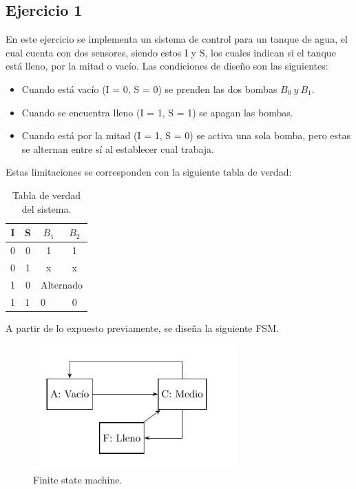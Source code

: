 



\subsection{Ejercicio 1}

En este ejercicio se implementa un sistema de control para un tanque de agua, el cual cuenta con dos sensores, siendo estos I y S, los cuales indican si el tanque está lleno, por la mitad o vacío. Las condiciones de diseño son las siguientes:
\begin{itemize}
\item Cuando está vacío (I = 0, S = 0) se prenden las dos bombas $B_0 \ y \ B_1$.
\item Cuando se encuentra lleno (I = 1, S = 1) se apagan las bombas.
\item Cuando está por la mitad (I = 1, S = 0) se activa una sola bomba, pero estas se alternan entre sí al establecer cual trabaja.
\end{itemize}

Estas limitaciones se corresponden con la siguiente tabla de verdad:
\begin{table}[H]
\centering
\begin{tabular}{cccc}
\hline
\textbf{I}              & \textbf{S}             & \textbf{$B_1$}         & \textbf{$B_2$} \\ \hline
0                       & 0                      & 1                      & 1              \\ 
0                       & 1                      & x                      & x              \\ 
1                       & 0                      & \multicolumn{2}{c}{Alternado}          \\ 
\multicolumn{1}{l}{1} & \multicolumn{1}{l}{1} & \multicolumn{1}{l}{0} & 0              \\ \hline
\end{tabular}
\caption{Tabla de verdad del sistema.}
\end{table}

A partir de lo expuesto previamente, se diseña la siguiente FSM.
\begin{figure}[H]
	\centering
	\includegraphics[width=0.7\textwidth]{ImagenesEjercicio1/Bloques-TT.pdf}
	\caption{Finite state machine.}
	\label{fig:fsm}
\end{figure}

